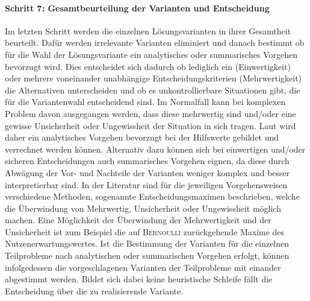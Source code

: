 \paragraph{Schritt 7: Gesamtbeurteilung der Varianten und Entscheidung} Im letzten Schritt werden die einzelnen Lösungsvarianten in ihrer Gesamtheit beurteilt. Dafür werden irrelevante Varianten eliminiert und danach bestimmt ob für die Wahl der Lösungsvariante ein analytisches oder summarisches Vorgehen bevorzugt wird. Dies entscheidet sich dadurch ob lediglich ein (Einwertigkeit) oder mehrere voneinander unabhängige Entscheidungskriterien (Mehrwertigkeit) die Alternativen unterscheiden und ob es unkontrollierbare Situationen gibt, die für die Variantenwahl entscheidend sind. Im Normalfall kann bei komplexen Problem davon ausgegangen werden, dass diese mehrwertig sind und/oder eine gewisse Unsicherheit oder Ungewissheit der Situation in sich tragen. Laut \cite{Grunig.2013} wird daher ein analytisches Vorgehen bevorzugt bei der Hilfswerte gebildet und verrechnet werden können. Alternativ dazu können sich bei einwertigen und/oder sicheren Entscheidungen auch summarisches Vorgehen eignen, da diese durch Abwägung der Vor- und Nachteile der Varianten weniger komplex und besser interpretierbar sind. 
In der Literatur sind für die jeweiligen Vorgehensweisen verschiedene Methoden, sogenannte Entscheidungsmaximen beschrieben, welche die Überwindung von Mehrwertig, Unsicherheit oder Ungewissheit möglich machen. Eine Möglichkeit der Überwindung der Mehrwertigkeit und der Unsicherheit ist zum Beispiel die auf \textsc{Bernoulli} zurückgehende Maxime des Nutzenerwartungswertes.\linebreak
Ist die Bestimmung der Varianten für die einzelnen Teilprobleme nach analytischen oder summarischen Vorgehen erfolgt, können infolgedessen die vorgeschlagenen Varianten der Teilprobleme mit einander abgestimmt werden. Bildet sich dabei keine heuristische Schleife fällt die Entscheidung über die zu realisierende Variante.

